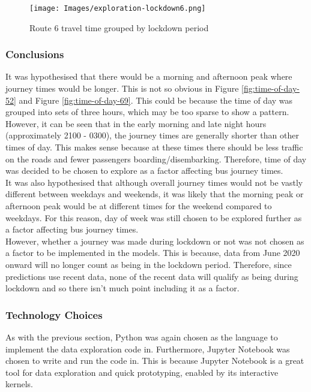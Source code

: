 \begin{figure}[H]
\begin{center}
    \texttt{[image: Images/exploration-lockdown6.png]}
    \caption{Route 6 travel time grouped by lockdown period}
    \label{fig:lockdown6}
\end{center}
\end{figure}

\subsubsection{Conclusions}

It was hypothesised that there would be a morning and afternoon peak where journey times would be longer. This is not so obvious in Figure \ref{fig:time-of-day-52} and Figure \ref{fig:time-of-day-69}. This could be because the time of day was grouped into sets of three hours, which may be too sparse to show a pattern. However, it can be seen that in the early morning and late night hours (approximately 2100 - 0300), the journey times are generally shorter than other times of day. This makes sense because at these times there should be less traffic on the roads and fewer passengers boarding/disembarking. Therefore, time of day was decided to be chosen to explore as a factor affecting bus journey times. \\

It was also hypothesised that although overall journey times would not be vastly different between weekdays and weekends, it was likely that the morning peak or afternoon peak would be at different times for the weekend compared to weekdays. For this reason, day of week was still chosen to be explored further as a factor affecting bus journey times. \\

However, whether a journey was made during lockdown or not was not chosen as a factor to be implemented in the models. This is because, data from June 2020 onward will no longer count as being in the lockdown period. Therefore, since predictions use recent data, none of the recent data will qualify as being during lockdown and so there isn't much point including it as a factor. 

\subsubsection{Technology Choices}

As with the previous section, Python was again chosen as the language to implement the data exploration code in. Furthermore, Jupyter Notebook was chosen to write and run the code in. This is because Jupyter Notebook is a great tool for data exploration and quick prototyping, enabled by its interactive kernels.

